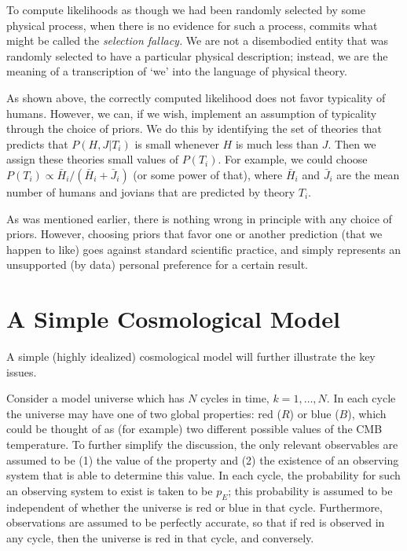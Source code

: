 \documentclass[pra,floatfix,preprint,nofootinbib,12pt]{revtex4}
\begin{document}
To compute likelihoods as though we had been randomly selected by some physical process, when there is no evidence for such a process, commits what might be called the
{\it selection fallacy.}  We are not a disembodied entity that was randomly selected to have a particular physical description; instead, we are the meaning of a transcription of `we' 
into the language of physical theory. 

As shown above, the correctly computed likelihood does not favor typicality of humans.
However, we can, if we wish, implement an assumption of typicality through the choice
of priors.  We do this by identifying the set of theories that predicts that $P(H,J|T_i)$ 
is small whenever $H$ is much less than $J$.   Then we assign these theories small values of $P(T_i)$.  For example, we could choose $P(T_i) \propto {\bar H}_i/({\bar H}_i+{\bar J}_i)$ 
(or some power of that), where $\bar H_i$ and $\bar J_i$ are the mean number of 
humans and jovians that are predicted by theory $T_i$. 

As was mentioned earlier, there is nothing wrong in principle with any choice of priors.  However,
choosing priors that favor one or another prediction (that we happen to like) goes against standard scientific practice, and simply represents an unsupported (by data) personal preference for a
certain result.   

\section{A Simple Cosmological Model}  

A simple (highly idealized) cosmological model will further illustrate the key issues. 

Consider a model universe which has $N$ cycles in time, $k=1, \ldots, N$. In each cycle the universe may have one of two global properties: red ($R$) or blue ($B$), which could be 
thought of as (for example) two different possible values of the CMB temperature.   To further simplify the discussion, the only relevant observables are assumed to be (1) the value of the property and (2) the existence of an observing system that is able 
to determine this value. 
In each cycle, the probability for such an observing system to exist is taken to be $p_E$; this probability is assumed to be independent of whether the universe is red or blue in that cycle. Furthermore, observations are assumed to be perfectly accurate, so that if red is observed in any cycle, then the universe is red in that cycle, and conversely.
\end{document}

